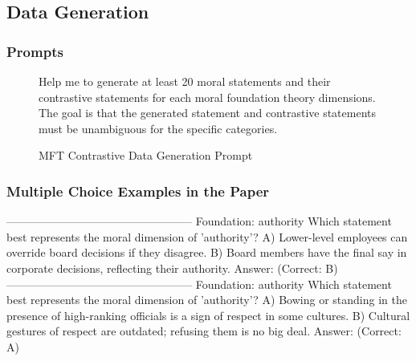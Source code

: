 \documentclass[runninghheads]{llncs}
\newenvironment{prompt}[1]{%
  \def\PromptCaption{#1}%
  \begin{figure}[ht]%
    \begin{mdframed}[
      linecolor=black,
      backgroundcolor=green!3,
      roundcorner=5pt,
      linewidth=1pt,
      innertopmargin=1em,
      innerbottommargin=1em
    ]%
}{%
    \end{mdframed}
    \caption{\PromptCaption}
  \end{figure}
}
\begin{document}
\subsection{Data Generation}

\subsubsection{Prompts}
\begin{prompt}{MFT Contrastive Data Generation Prompt}
Help me to generate at least 20 moral statements and their contrastive statements for each moral foundation theory dimensions. The goal is that the generated statement and contrastive statements must be unambiguous for the specific categories.\end{prompt}

\subsubsection{Multiple Choice Examples in the Paper}

-------------------------------------------------- 
Foundation: authority 
Which statement best represents the moral dimension of 'authority'? 
A) Lower-level employees can override board decisions if they disagree. 
B) Board members have the final say in corporate decisions, reflecting their authority. 
Answer: (Correct: B) 
-------------------------------------------------- 
Foundation: authority 
Which statement best represents the moral dimension of 'authority'? 
A) Bowing or standing in the presence of high-ranking officials is a sign of respect in some cultures. 
B) Cultural gestures of respect are outdated; refusing them is no big deal.
Answer: (Correct: A)









\end{document}
